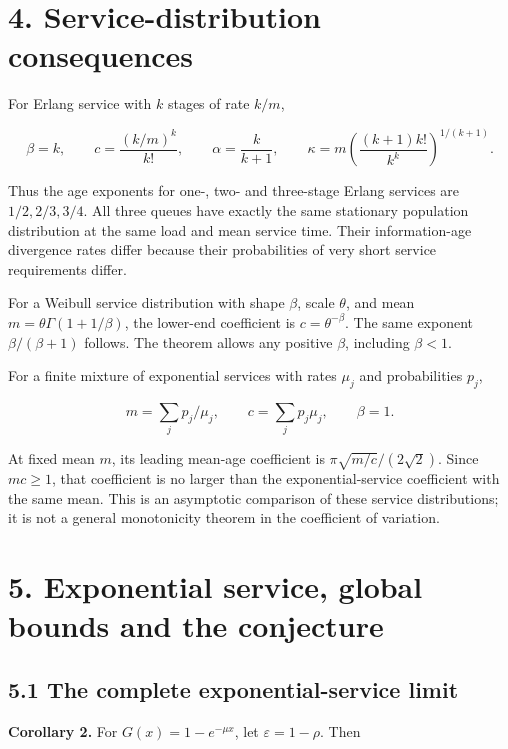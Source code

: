 \documentclass[
  11pt,
  a4paper,
]{scrartcl}
\begin{document}
\section{4. Service-distribution
consequences}\label{service-distribution-consequences}

For Erlang service with \(k\) stages of rate \(k/m\),

\[
\beta=k,\qquad c=\frac{(k/m)^k}{k!},\qquad
\alpha=\frac{k}{k+1},\qquad
\kappa=m\left(\frac{(k+1)k!}{k^k}\right)^{1/(k+1)}.
\]

Thus the age exponents for one-, two- and three-stage Erlang services
are \(1/2,2/3,3/4\). All three queues have exactly the same stationary
population distribution at the same load and mean service time. Their
information-age divergence rates differ because their probabilities of
very short service requirements differ.

For a Weibull service distribution with shape \(\beta\), scale
\(\theta\), and mean \(m=\theta\Gamma(1+1/\beta)\), the lower-end
coefficient is \(c=\theta^{-\beta}\). The same exponent
\(\beta/(\beta+1)\) follows. The theorem allows any positive \(\beta\),
including \(\beta<1\).

For a finite mixture of exponential services with rates \(\mu_j\) and
probabilities \(p_j\),

\[
m=\sum_jp_j/\mu_j,\qquad c=\sum_jp_j\mu_j,\qquad\beta=1.
\]

At fixed mean \(m\), its leading mean-age coefficient is
\(\pi\sqrt{m/c}/(2\sqrt2)\). Since \(mc\geq1\), that coefficient is no
larger than the exponential-service coefficient with the same mean. This
is an asymptotic comparison of these service distributions; it is not a
general monotonicity theorem in the coefficient of variation.

\section{5. Exponential service, global bounds and the
conjecture}\label{exponential-service-global-bounds-and-the-conjecture}

\subsection{5.1 The complete exponential-service
limit}\label{the-complete-exponential-service-limit}

\textbf{Corollary 2.} For \(G(x)=1-e^{-\mu x}\), let
\(\varepsilon=1-\rho\). Then
\end{document}
